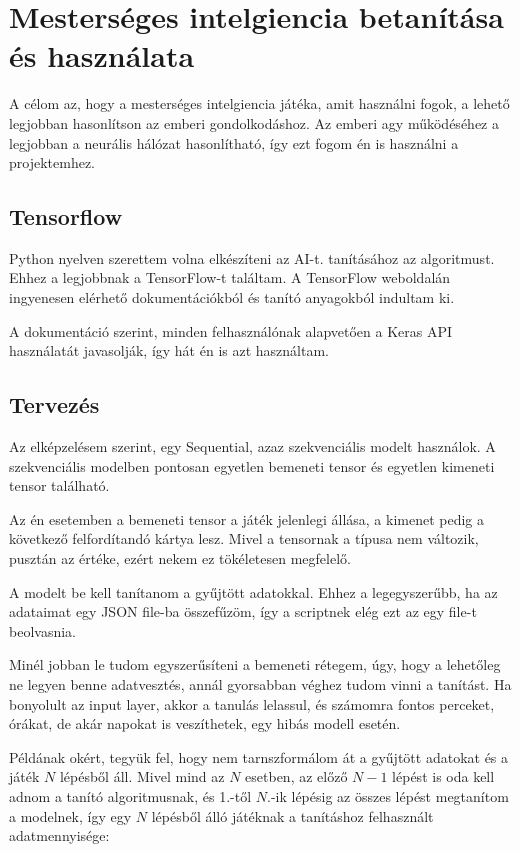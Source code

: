 \chapter{Mesterséges intelgiencia betanítása és használata}
\thispagestyle{fancy}
\pagestyle{fancy}


A célom az, hogy a mesterséges intelgiencia játéka, amit használni fogok, a lehető legjobban hasonlítson az emberi gondolkodáshoz. Az emberi agy működéséhez a legjobban 
a neurális hálózat hasonlítható, így ezt fogom én is használni a projektemhez. 



\section{Tensorflow}
Python nyelven szerettem volna elkészíteni az AI-t. tanításához az algoritmust. Ehhez a legjobbnak a TensorFlow-t \cite{tensorflow2015-whitepaper} találtam. A TensorFlow weboldalán ingyenesen elérhető dokumentációkból és tanító anyagokból indultam ki. 

A dokumentáció szerint, minden felhasználónak alapvetően a Keras API használatát javasolják, így hát én is azt használtam. 

\section{Tervezés}
Az elképzelésem szerint, egy Sequential, azaz szekvenciális modelt használok. A szekvenciális modelben pontosan egyetlen bemeneti tensor és egyetlen kimeneti tensor található. 

Az én esetemben a bemeneti tensor a játék jelenlegi állása, a kimenet pedig a következő felfordítandó kártya lesz. Mivel a tensornak a típusa nem változik, pusztán az értéke, ezért nekem ez tökéletesen megfelelő. 

A modelt be kell tanítanom a gyűjtött adatokkal. Ehhez a legegyszerűbb, ha az adataimat egy JSON file-ba összefűzöm, így a scriptnek elég ezt az egy file-t beolvasnia. 

Minél jobban le tudom egyszerűsíteni a bemeneti rétegem, úgy, hogy a lehetőleg ne legyen benne adatvesztés, annál gyorsabban véghez tudom vinni a tanítást. 
Ha bonyolult az input layer, akkor a tanulás lelassul, és számomra fontos perceket, órákat, de akár napokat is veszíthetek, egy hibás modell esetén. 

Példának okért, tegyük fel, hogy nem tarnszformálom át a gyűjtött adatokat és a játék $N$ lépésből áll.
Mivel mind az $N$ esetben, az előző $N-1$ lépést is oda kell adnom a tanító algoritmusnak, és 1.-től $N.$-ik lépésig az összes lépést megtanítom a modelnek, így 
egy $N$ lépésből álló játéknak a tanításhoz felhasznált adatmennyisége:


